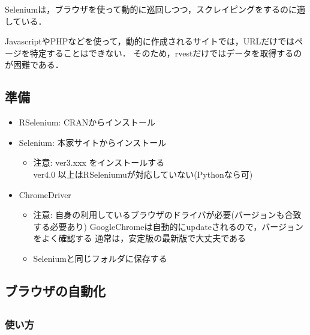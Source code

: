 \documentclass[
]{article}
\providecommand{\tightlist}{%
  \setlength{\itemsep}{0pt}\setlength{\parskip}{0pt}}
\begin{document}
Seleniumは，ブラウザを使って動的に巡回しつつ，スクレイピングをするのに適している．

JavascriptやPHPなどを使って，動的に作成されるサイトでは，URLだけではページを特定することはできない．
そのため，rvestだけではデータを取得するのが困難である．

\hypertarget{ux6e96ux5099-3}{%
\subsection{準備}\label{ux6e96ux5099-3}}

\begin{itemize}
\tightlist
\item
  RSelenium: CRANからインストール\\
\item
  Selenium: 本家サイトからインストール

  \begin{itemize}
  \tightlist
  \item
    注意: ver3.xxx をインストールする\\
    ver4.0 以上はRSeleniumuが対応していない(Pythonなら可)\\
  \end{itemize}
\item
  ChromeDriver

  \begin{itemize}
  \tightlist
  \item
    注意: 自身の利用しているブラウザのドライバが必要(バージョンも合致する必要あり)
    GoogleChromeは自動的にupdateされるので，バージョンをよく確認する
    通常は，安定版の最新版で大丈夫である
  \item
    Seleniumと同じフォルダに保存する
  \end{itemize}
\end{itemize}

\hypertarget{ux30d6ux30e9ux30a6ux30b6ux306eux81eaux52d5ux5316}{%
\subsection{ブラウザの自動化}\label{ux30d6ux30e9ux30a6ux30b6ux306eux81eaux52d5ux5316}}

\hypertarget{section-2}{%
\subsection{}\label{section-2}}

\hypertarget{ux4f7fux3044ux65b9-2}{%
\subsubsection{使い方}\label{ux4f7fux3044ux65b9-2}}
\end{document}
